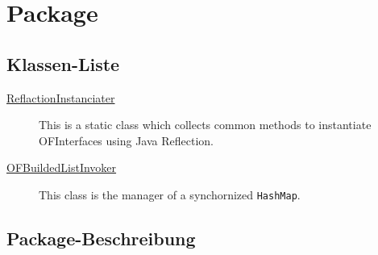 
\chapter[Package ontologyFramework.OFRunning.OFInvokingManager]{Package }\label{ontologyFramework.OFRunning.OFInvokingManager-package}



\section{Klassen-Liste}
\begin{description}
\item[{\hyperlink{ontologyFramework.OFRunning.OFInvokingManager.ReflactionInstanciater-class}{ReflactionInstanciater}}]
This is a static class which collects common methods to instantiate OFInterfaces using 
 Java Reflection.
\hfill\pageref{ontologyFramework.OFRunning.OFInvokingManager.ReflactionInstanciater-class}

\item[{\hyperlink{ontologyFramework.OFRunning.OFInvokingManager.OFBuildedListInvoker-class}{OFBuildedListInvoker}}]
This class is the manager of a synchornized \texttt{HashMap}.
\hfill\pageref{ontologyFramework.OFRunning.OFInvokingManager.OFBuildedListInvoker-class}

\end{description}
\section{Package-Beschreibung}



